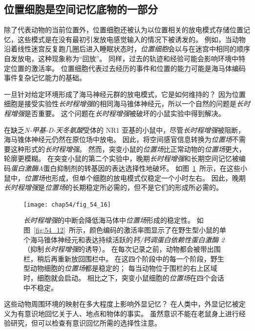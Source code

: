\subsection{位置细胞是空间记忆底物的一部分}

除了代表动物的当前位置外，位置细胞还被认为以位置相关的放电模式存储位置记忆，这些模式是在没有最初引发放电感觉输入的情况下被诱发的。
例如，当动物沿着线性迷宫反复跑几圈后进入睡眠状态时，\textit{位置细胞}会以与在迷宫中相同的顺序自发放电，这种现象称为“回放”。
同样，过去的轨迹和经验可能会影响环境中特定位置的激活率。
位置细胞代表过去经历的事件和位置的能力可能是海马体编码事件复杂记忆能力的基础。


一旦针对给定环境形成了海马神经元群的放电模式，它是如何维持的？
因为位置细胞是接受实验性\textit{长时程增强}的相同海马锥体神经元，所以一个自然的问题是\textit{长时程增强}是否重要。
这个问题在\textit{长时程增强}被破坏的小鼠实验中得到解决。


在缺乏\textit{N-甲基-D-天冬氨酸}受体的 NR1 亚基的小鼠中，尽管\textit{长时程增强}被阻断，海马锥体神经元仍然在原位场中放电。
因此，将空间感官信息转换为\textit{位置场}不需要这种形式的\textit{长时程增强}。
然而，突变小鼠的\textit{位置场}比正常动物的\textit{位置场}更大，轮廓更模糊。
在突变小鼠的第二个实验中，晚期\textit{长时程增强}和长期空间记忆被编码\textit{蛋白激酶A}蛋白抑制剂的转基因的表达选择性地破坏。
如图~\ref{fig:54_16}~所示，在这些小鼠中，\textit{位置场}也形成，但单个细胞的放电模式仅稳定一个小时左右。
因此，晚期\textit{长时程增强}是\textit{位置场}的长期稳定所必需的，但不是它们的形成所必需的。


\begin{figure}[htbp]
	\centering
	\texttt{[image: chap54/fig\_54\_16]}
	\caption{\textit{长时程增强}的中断会降低海马体中\textit{位置场}形成的稳定性。
		如图~\ref{fig:54_12}~所示，颜色编码的激活率图显示了在野生型小鼠的单个海马锥体神经元和表达持续活跃的\textit{钙/钙调蛋白依赖性蛋白激酶 2}（抑制\textit{长时程增强}的诱导）。
		在每次记录之前，动物都会被带出围栏，稍后再重新放回围栏中。
		在这四个阶段中的每一个阶段，野生型动物细胞的\textit{位置场}都是稳定的；
		每当动物位于围栏的右上区域时，细胞就会启动。
		相比之下，突变小鼠细胞的\textit{位置场}在四个会话中不稳定\cite{rotenberg1996mice}。}
	\label{fig:54_16}
\end{figure}


这些动物周围环境的映射在多大程度上影响外显记忆？
在人类中，外显记忆被定义为有意识地回忆关于人、地点和物体的事实。
虽然意识不能在老鼠身上进行经验研究，但可以检查有意识回忆所需的选择性注意。


